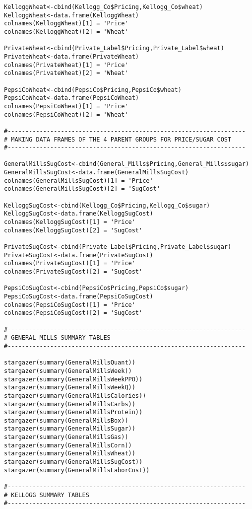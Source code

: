 \documentclass[12pt,english]{article}
\begin{document}
\begin{lstlisting}
KelloggWheat<-cbind(Kellogg_Co$Pricing,Kellogg_Co$wheat)
KelloggWheat<-data.frame(KelloggWheat)
colnames(KelloggWheat)[1] = 'Price'
colnames(KelloggWheat)[2] = 'Wheat'

PrivateWheat<-cbind(Private_Label$Pricing,Private_Label$wheat)
PrivateWheat<-data.frame(PrivateWheat)
colnames(PrivateWheat)[1] = 'Price'
colnames(PrivateWheat)[2] = 'Wheat'

PepsiCoWheat<-cbind(PepsiCo$Pricing,PepsiCo$wheat)
PepsiCoWheat<-data.frame(PepsiCoWheat)
colnames(PepsiCoWheat)[1] = 'Price'
colnames(PepsiCoWheat)[2] = 'Wheat'

#-------------------------------------------------------------------
# MAKING DATA FRAMES OF THE 4 PARENT GROUPS FOR PRICE/SUGAR COST
#-------------------------------------------------------------------

GeneralMillsSugCost<-cbind(General_Mills$Pricing,General_Mills$sugar)
GeneralMillsSugCost<-data.frame(GeneralMillsSugCost)
colnames(GeneralMillsSugCost)[1] = 'Price'
colnames(GeneralMillsSugCost)[2] = 'SugCost'

KelloggSugCost<-cbind(Kellogg_Co$Pricing,Kellogg_Co$sugar)
KelloggSugCost<-data.frame(KelloggSugCost)
colnames(KelloggSugCost)[1] = 'Price'
colnames(KelloggSugCost)[2] = 'SugCost'

PrivateSugCost<-cbind(Private_Label$Pricing,Private_Label$sugar)
PrivateSugCost<-data.frame(PrivateSugCost)
colnames(PrivateSugCost)[1] = 'Price'
colnames(PrivateSugCost)[2] = 'SugCost'

PepsiCoSugCost<-cbind(PepsiCo$Pricing,PepsiCo$sugar)
PepsiCoSugCost<-data.frame(PepsiCoSugCost)
colnames(PepsiCoSugCost)[1] = 'Price'
colnames(PepsiCoSugCost)[2] = 'SugCost'

#-------------------------------------------------------------------
# GENERAL MILLS SUMMARY TABLES
#-------------------------------------------------------------------

stargazer(summary(GeneralMillsQuant))
stargazer(summary(GeneralMillsWeek))
stargazer(summary(GeneralMillsWeekPPO))
stargazer(summary(GeneralMillsWeekQ))
stargazer(summary(GeneralMillsCalories))
stargazer(summary(GeneralMillsCarbs))
stargazer(summary(GeneralMillsProtein))
stargazer(summary(GeneralMillsBox))
stargazer(summary(GeneralMillsSugar))
stargazer(summary(GeneralMillsGas))
stargazer(summary(GeneralMillsCorn))
stargazer(summary(GeneralMillsWheat))
stargazer(summary(GeneralMillsSugCost))
stargazer(summary(GeneralMillsLaborCost))

#-------------------------------------------------------------------
# KELLOGG SUMMARY TABLES
#-------------------------------------------------------------------


\end{lstlisting}
\end{document}
